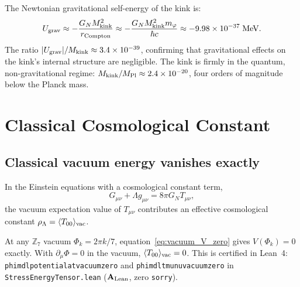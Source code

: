 \documentclass[11pt]{article}
\theoremstyle{remark}
\newcommand{\ZS}{\mathbb{Z}_7}
\newcommand{\lean}[1]{%
  \penalty-100
  \begingroup\def\_{\textunderscore\allowbreak}\texttt{#1}\endgroup}
\newcommand{\Mkink}{M_{\rm kink}}
\newcommand{\CatAL}{\ensuremath{\textbf{A}_{\rm Lean}}}
\newcommand{\Tmunu}{T_{\mu\nu}}
\newcommand{\GN}{G_N}
\newcommand{\MPl}{M_{\rm Pl}}
\newcommand{\rhoLam}{\rho_\Lambda}
\begin{document}
The Newtonian gravitational self-energy of the kink is:
\begin{equation}
  U_{\rm grav} \approx -\frac{\GN \Mkink^2}{r_{\rm Compton}}
  \approx -\frac{\GN \Mkink^2 m_\varphi}{\hbar c}
  \approx -9.98\times10^{-37}\;\text{MeV}.
\label{eq:self_energy}
\end{equation}
The ratio $|U_{\rm grav}|/\Mkink \approx 3.4\times10^{-39}$, confirming that
gravitational effects on the kink's internal structure are negligible.
The kink is firmly in the quantum, non-gravitational regime:
$\Mkink/\MPl \approx 2.4\times10^{-20}$, four orders of magnitude below the Planck mass.

\section{Classical Cosmological Constant}
\label{sec:cosmo}

\subsection{Classical vacuum energy vanishes exactly}

In the Einstein equations with a cosmological constant term,
\begin{equation}
  G_{\mu\nu} + \Lambda g_{\mu\nu} = 8\pi\GN\Tmunu,
\label{eq:efe_with_lambda}
\end{equation}
the vacuum expectation value of $\Tmunu$ contributes an effective cosmological
constant $\rhoLam = \langle T_{00}\rangle_{\rm vac}$.

At any $\ZS$ vacuum $\Phi_k = 2\pi k/7$, equation~\eqref{eq:vacuum_V_zero}
gives $V(\Phi_k) = 0$ exactly.
With $\partial_\mu\Phi = 0$ in the vacuum, $\langle T_{00}\rangle_{\rm vac} = 0$.
This is certified in Lean~4: \lean{phimdl\_potential\_at\_vacuum\_zero} and
\lean{phimdl\_tmunu\_vacuum\_zero} in \lean{StressEnergyTensor.lean} ($\CatAL$, zero \texttt{sorry}).
\end{document}
